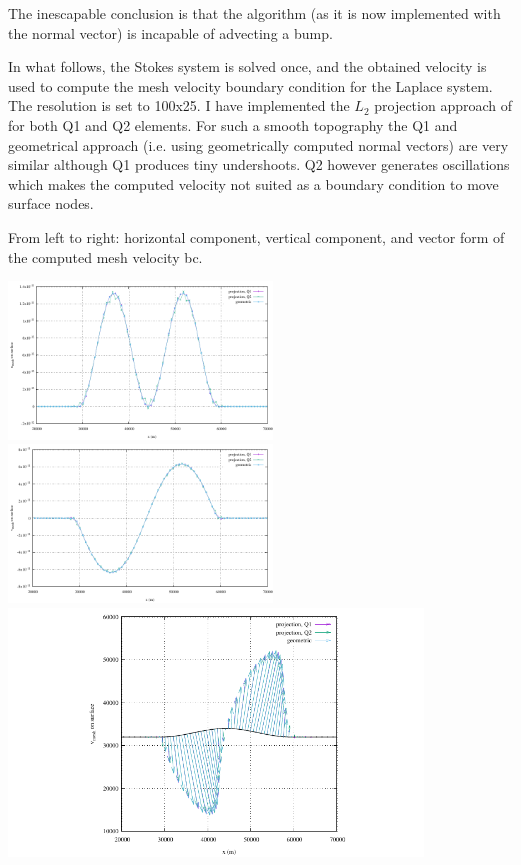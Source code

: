 The inescapable conclusion is that the algorithm (as it is now implemented with the normal 
vector) is incapable of advecting a bump. 

In what follows, the Stokes system is solved once, and the obtained velocity
is used to compute the mesh velocity boundary condition for the Laplace system. 
The resolution is set to 100x25. I have implemented the $L_2$ projection approach 
of \cite{robh17} for both Q1 and Q2 elements. For such a smooth topography the 
Q1 and geometrical approach (i.e. using geometrically computed normal vectors) are
very similar although Q1 produces tiny undershoots. Q2 however generates oscillations
which makes the computed velocity not suited as a boundary condition to move surface nodes. 

From left to right: horizontal component, vertical component, and vector form 
of the computed mesh velocity bc.

\begin{center}
\includegraphics[width=7cm]{python_codes/fieldstone_54/images/exp7/100x25/umesh}
\includegraphics[width=7cm]{python_codes/fieldstone_54/images/exp7/100x25/vmesh}\\
\includegraphics[width=11cm]{python_codes/fieldstone_54/images/exp7/100x25/velmesh}
\end{center}

